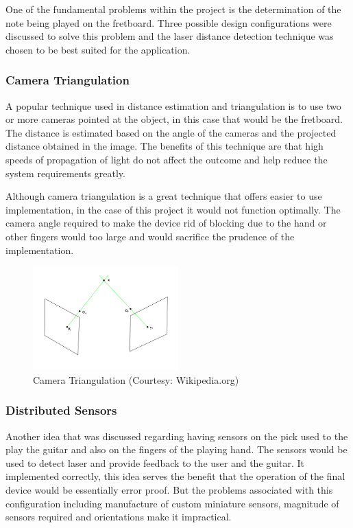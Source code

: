\documentclass[11pt]{article}
\begin{document}
One of the fundamental problems within the project is the determination of the note being played on the fretboard. Three possible design configurations were discussed to solve this problem and the laser distance detection technique was chosen to be best suited for the application.

\subsubsection{Camera Triangulation}

A popular technique used in distance estimation and triangulation is to use two or more cameras pointed at the object, in this case that would be the fretboard. The distance is estimated based on the angle of the cameras and the projected distance obtained in the image. The benefits of this technique are that high speeds of propagation of light do not affect the outcome and help reduce the system requirements greatly. 

Although camera triangulation is a great technique that offers easier to use implementation, in the case of this project it would not function optimally. The camera angle required to make the device rid of blocking due to the hand or other fingers would too large and would sacrifice the prudence of the implementation. 


\newpage{}

\begin{figure}[!h]
\centering
\includegraphics[width=0.5\textwidth]{camera.png}
\caption{Camera Triangulation (Courtesy: Wikipedia.org)}
\label{camera}
\end{figure}

\subsubsection{Distributed Sensors}

Another idea that was discussed regarding having sensors on the pick used to the play the guitar and also on the fingers of the playing hand. The sensors would be used to detect laser and provide feedback to the user and the guitar. It implemented correctly, this idea serves the benefit that the operation of the final device would be essentially error proof. But the problems associated with this configuration including manufacture of custom miniature sensors, magnitude of sensors required and orientations make it impractical. 
\end{document}

